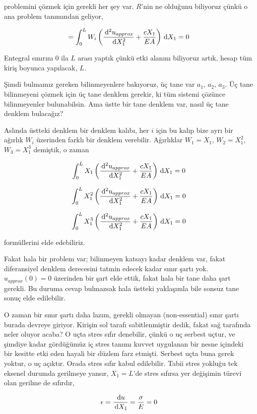 \documentclass[12pt,fleqn]{article}\usepackage{../../common}
\begin{document}
problemini çözmek için gerekli her şey var. $R$'nin ne olduğunu biliyoruz
çünkü o ana problem tanımından geliyor,

$$
= \int_{0}^{L} W_i
\left(
 \frac{\,\mathrm{d}^2 u_{approx}}{\,\mathrm{d} X_1^2} + \frac{c X_1}{EA}
\right) \,\mathrm{d} X_1 = 0
$$

Entegral sınırını 0 ila $L$ arası yaptık çünkü etki alanını biliyoruz artık,
hesap tüm kiriş boyunca yapılacak, $L$.

Şimdi bulmamız gereken bilinmeyenlere bakıyoruz, üç tane var $a_1$, $a_2$,
$a_3$. Üç tane bilinmeyeni çözmek için üç tane denklem gerekir, ki tüm sistemi
çözünce bilinmeyenler bulunabilsin. Ama üstte bir tane denklem var, nasıl
üç tane denklem bulacağız?

Aslında üstteki denklem bir denklem kalıbı, her $i$ için bu kalıp bize ayrı bir
ağırlık $W_i$ üzerinden farklı bir denklem verebilir. Ağırlıklar $W_1 = X_1$,
$W_2 = X_1^2$, $W_3 = X_1^3$ demiştik, o zaman 

$$
\int_{0}^{L} X_1 \left( \frac{\,\mathrm{d}^2 u_{approx}}{\,\mathrm{d} X_1^2} + \frac{c X_1}{EA}  \right) \,\mathrm{d} X_1 = 0
$$

$$
\int_{0}^{L} X_1^2 \left( \frac{\,\mathrm{d}^2 u_{approx}}{\,\mathrm{d} X_1^2} + \frac{c X_1}{EA}  \right) \,\mathrm{d} X_1 = 0
$$

$$
\int_{0}^{L} X_1^3 \left( \frac{\,\mathrm{d}^2 u_{approx}}{\,\mathrm{d} X_1^2} + \frac{c X_1}{EA}  \right) \,\mathrm{d} X_1 = 0
$$

formüllerini elde edebiliriz.

Fakat hala bir problem var; bilinmeyen katsayı kadar denklem var, fakat
diferansiyel denklem derecesini tatmin edecek kadar sınır şartı
yok. $u_{approx}(0)=0$ üzerinden bir şart elde ettik, fakat hala bir tane
daha şart gerekli. Bu duruma cevap bulmazsak hala üstteki yaklaşımla bile
sonsuz tane sonuç elde edilebilir.

O zaman bir sınır şartı daha lazım, gerekli olmayan (non-essential) sınır şartı
burada devreye giriyor. Kirişin sol tarafı sabitlenmiştir dedik, fakat sağ
tarafında neler oluyor acaba? O uçta stres sıfır denebilir, çünkü o uç serbest
uçtur, ve şimdiye kadar gördüğümüz iç stres tanımı kuvvet uygulanan bir nesne
içindeki bir kesitte etki eden hayali bir düzlem farz etmişti. Serbest uçta buna
gerek yoktur, o uç açıktır. Orada stres sıfır kabul edilebilir. Tabii stres
yokluğu tek eksenel durumda gerilmeye yansır, $X_1=L$'de stres sıfırsa yer
değişimin türevi olan gerilme de sıfırdır,

$$
\epsilon = \frac{\,\mathrm{d} u}{\,\mathrm{d} X_1} = \frac{\sigma}{E} = 0
$$
\end{document}
